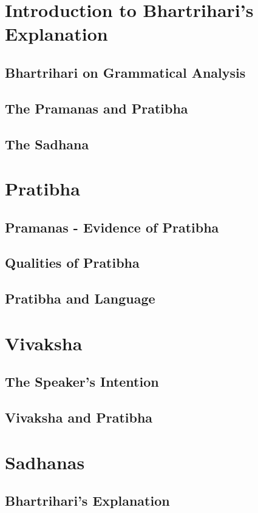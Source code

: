 \documentclass[a4paper,10pt]{article}
\begin{document}
\newpage
\section{Introduction to Bhartrihari's Explanation}
\subsection{Bhartrihari on Grammatical Analysis}
\subsection{The Pramanas and Pratibha}
\subsection{The Sadhana}
\section{Pratibha}
\subsection{Pramanas - Evidence of Pratibha}
\subsection{Qualities of Pratibha}
\subsection{Pratibha and Language}
\section{Vivaksha}
\subsection{The Speaker's Intention}
\subsection{Vivaksha and Pratibha}
\section{Sadhanas}
\subsection{Bhartrihari's Explanation}
\end{document}
